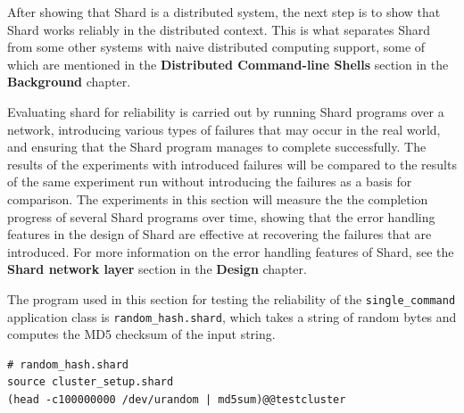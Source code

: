 \documentclass[twoside]{report}
\begin{document}

After showing that Shard is a distributed system, the next step is to show that Shard works reliably in the distributed context.
This is what separates Shard from some other systems with naive distributed computing support, some of which are mentioned in the \textbf{Distributed Command-line Shells} section in the \textbf{Background} chapter.

Evaluating shard for reliability is carried out by running Shard programs over a network, introducing various types of failures that may occur in the real world, and ensuring that the Shard program manages to complete successfully.
The results of the experiments with introduced failures will be compared to the results of the same experiment run without introducing the failures as a basis for comparison.
The experiments in this section will measure the the completion progress of several Shard programs over time, showing that the error handling features in the design of Shard are effective at recovering the failures that are introduced.
For more information on the error handling features of Shard, see the \textbf{Shard network layer} section in the \textbf{Design} chapter.

The program used in this section for testing the reliability of the \texttt{single\_command} application class is \texttt{random\_hash.shard}, which takes a string of random bytes and computes the MD5 checksum of the input string.

\begin{minipage}[c]{\textwidth-15pt}
  \begin{lstlisting}[language=Shard]
# random_hash.shard
source cluster_setup.shard
(head -c100000000 /dev/urandom | md5sum)@@testcluster
\end{lstlisting}
  \smallskip
\end{minipage}
\end{document}
